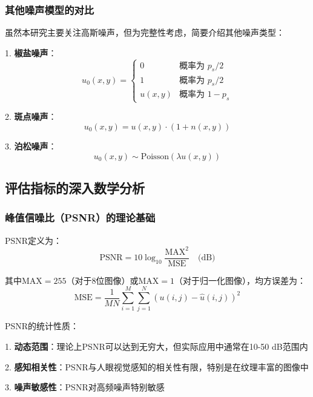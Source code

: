 \documentclass[a4paper,12pt]{ctexart}
\begin{document}
\subsubsection{其他噪声模型的对比}

虽然本研究主要关注高斯噪声，但为完整性考虑，简要介绍其他噪声类型：

1. \textbf{椒盐噪声}：
\begin{equation}
u_0(x,y) = \begin{cases}
0 & \text{概率为 } p_s/2 \\
1 & \text{概率为 } p_s/2 \\
u(x,y) & \text{概率为 } 1-p_s
\end{cases}
\end{equation}

2. \textbf{斑点噪声}：
\begin{equation}
u_0(x,y) = u(x,y) \cdot (1 + n(x,y))
\end{equation}

3. \textbf{泊松噪声}：
\begin{equation}
u_0(x,y) \sim \text{Poisson}(\lambda u(x,y))
\end{equation}

\subsection{评估指标的深入数学分析}

\subsubsection{峰值信噪比（PSNR）的理论基础}

PSNR定义为：
\begin{equation}
\text{PSNR} = 10 \log_{10} \frac{\text{MAX}^2}{\text{MSE}} \quad \text{(dB)}
\end{equation}

其中$\text{MAX} = 255$（对于8位图像）或$\text{MAX} = 1$（对于归一化图像），均方误差为：
\begin{equation}
\text{MSE} = \frac{1}{MN} \sum_{i=1}^{M} \sum_{j=1}^{N} (u(i,j) - \hat{u}(i,j))^2
\end{equation}

PSNR的统计性质：

1. \textbf{动态范围}：理论上PSNR可以达到无穷大，但实际应用中通常在10-50 dB范围内

2. \textbf{感知相关性}：PSNR与人眼视觉感知的相关性有限，特别是在纹理丰富的图像中

3. \textbf{噪声敏感性}：PSNR对高频噪声特别敏感
\end{document}
